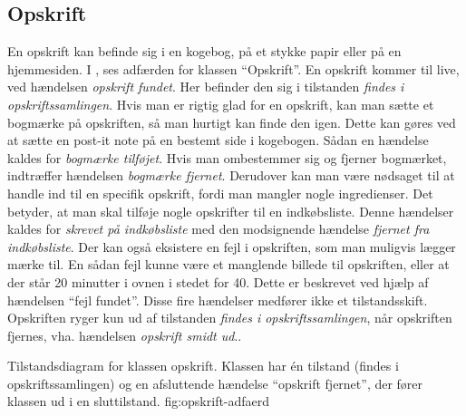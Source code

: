 \subsection{Opskrift}
En opskrift kan befinde sig i en kogebog, på et stykke papir eller på en hjemmesiden. I , ses adfærden for klassen ``Opskrift''. En opskrift kommer til live, ved hændelsen \textit{opskrift fundet}. Her befinder den sig i tilstanden \textit{findes i opskriftssamlingen}. Hvis man er rigtig glad for en opskrift, kan man sætte et bogmærke på opskriften, så man hurtigt kan finde den igen. Dette kan \fx gøres ved at sætte en post-it note på en bestemt side i kogebogen. Sådan en hændelse kaldes for \textit{bogmærke tilføjet}. Hvis man ombestemmer sig og fjerner bogmærket, indtræffer hændelsen \textit{bogmærke fjernet}. Derudover kan man være nødsaget til at handle ind til en specifik opskrift, fordi man mangler nogle ingredienser. Det betyder, at man skal tilføje nogle opskrifter til en indkøbsliste. Denne hændelser kaldes for \textit{skrevet på indkøbsliste} med den modsignende hændelse \textit{fjernet fra indkøbsliste}. Der kan også eksistere en fejl i opskriften, som man muligvis lægger mærke til. En sådan fejl kunne være et manglende billede til opskriften, eller at der står 20 minutter i ovnen i stedet for 40. Dette er beskrevet ved hjælp af hændelsen ``fejl fundet''. Disse fire hændelser medfører ikke et tilstandsskift. Opskriften ryger kun ud af tilstanden \textit{findes i opskriftssamlingen}, når opskriften fjernes, vha. hændelsen \textit{opskrift smidt ud}..

  {Tilstandsdiagram for klassen opskrift. Klassen har én tilstand (findes i opskriftssamlingen) og en afsluttende hændelse ``opskrift fjernet'', der fører klassen ud i en sluttilstand.}
  {fig:opskrift-adfaerd}
